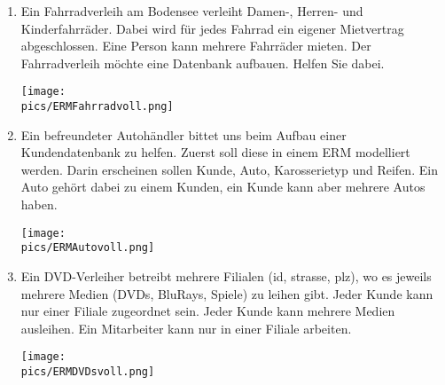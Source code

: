 \begin{Answer}[ref=ERMErstellen2]
	\begin{enumerate}
		\item Ein Fahrradverleih am Bodensee verleiht Damen-, Herren- und Kinderfahrräder. Dabei wird für jedes Fahrrad ein eigener Mietvertrag abgeschlossen. Eine Person kann mehrere Fahrräder mieten. Der Fahrradverleih möchte eine Datenbank aufbauen. Helfen Sie dabei.

		\begin{minipage}{0.8\textwidth}
			\centering\texttt{[image: \\pics/ERMFahrradvoll.png]}
		\end{minipage}
		\item Ein befreundeter Autohändler bittet uns beim Aufbau einer Kundendatenbank zu helfen. Zuerst soll diese in einem ERM modelliert werden. Darin erscheinen sollen Kunde, Auto, Karosserietyp und Reifen. Ein Auto gehört dabei zu einem Kunden, ein Kunde kann aber mehrere Autos haben.

		\begin{minipage}{0.8\textwidth}
			\centering\texttt{[image: \\pics/ERMAutovoll.png]}
		\end{minipage}
		\item Ein DVD-Verleiher betreibt mehrere Filialen (id, strasse, plz), wo es jeweils mehrere Medien (DVDs, BluRays, Spiele) zu leihen gibt. Jeder Kunde kann nur einer Filiale zugeordnet sein. Jeder Kunde kann mehrere Medien ausleihen. Ein Mitarbeiter kann nur in einer Filiale arbeiten.

		\begin{minipage}{0.8\textwidth}
			\centering\texttt{[image: \\pics/ERMDVDsvoll.png]}
		\end{minipage}
	\end{enumerate}
\end{Answer}

